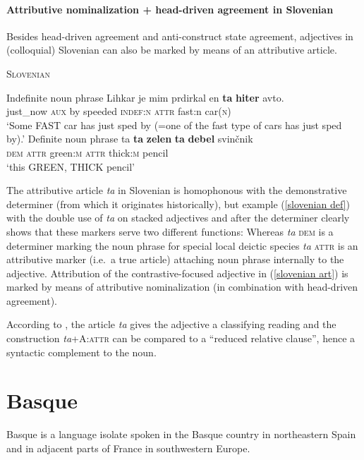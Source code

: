 \paragraph{Attributive nominalization + head-driven agreement in Slovenian}
Besides head-driven agreement and anti-construct state agreement, adjectives in (colloquial) Slovenian can also be marked by means of an attributive article.
\begin{exe}
\ex \textsc{Slovenian} \citep{marusic-etal2007} \label{slovenian art}
\begin{xlist}
\ex Indefinite noun phrase
\gll	Lihkar je mim prdirkal en \textbf{ta} \textbf{hiter} avto.\\
	just\_now \textsc{aux} by speeded \textsc{indef:n} \textsc{attr} fast:n car(\textsc{n})\\
\glt	‘Some FAST car has just sped by (=one of the fast type of cars has just sped by).’ 
\ex Definite noun phrase \label{slovenian def}
\gll 	ta \textbf{ta} \textbf{zelen} \textbf{ta} \textbf{debel} svin\v{c}nik\\
	\textsc{dem} \textsc{attr} green\textsc{:m} \textsc{attr} thick\textsc{:m} pencil\\
\glt 	‘this GREEN, THICK pencil’
\end{xlist}
\end{exe}
The attributive article \textit{ta} in Slovenian is homophonous with the demonstrative determiner (from which it originates historically), but example (\ref{slovenian def}) with the double use of \textit{ta} on stacked adjectives and after the determiner clearly shows that these markers serve two different functions: Whereas \textit{ta} \textsc{dem} is a determiner marking the noun phrase for special local deictic species \textit{ta} \textsc{attr} is an attributive marker (i.e.~a true article) attaching noun phrase internally to the adjective. Attribution of the contrastive-focused adjective in (\ref{slovenian art}) is marked by means of attributive nominalization (in combination with head-driven agreement).

According to \cite{marusic-etal2007}, the article \textit{ta} gives the adjective a classifying reading and the construction \textit{ta}+A:\textsc{attr} can be compared to a “reduced relative clause”, hence a syntactic complement to the noun.

\section{Basque}
Basque is a language isolate spoken in the Basque country in northeastern Spain and in adjacent parts of France in southwestern Europe. 

